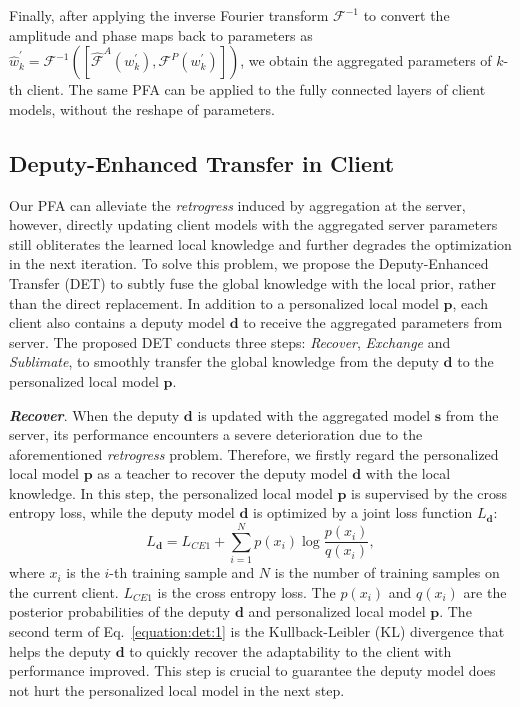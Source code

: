 \documentclass[runningheads]{llncs}
\begin{document}
Finally, after applying the inverse Fourier transform $\mathcal{F}^{-1}$ to convert the amplitude and phase maps back to parameters as $\hat{w}_{k}^{'}=\mathcal{F}^{-1}([\hat{\mathcal{F}}^{A}(w_{k}^{'}), \mathcal{F}^{P}(w_{k}^{'})])$, we obtain the aggregated parameters of $k$-th client. The same PFA can be applied to the fully connected layers of client models, without the reshape of parameters.
\subsection{Deputy-Enhanced Transfer in Client}
Our PFA can alleviate the \textit{retrogress} induced by aggregation at the server, however, directly updating client models with the aggregated server parameters still obliterates the learned local knowledge and further degrades the optimization in the next iteration. To solve this problem, we propose the Deputy-Enhanced Transfer (DET) to subtly fuse the global knowledge with the local prior, rather than the direct replacement. 
In addition to a personalized local model $\bm{p}$, each client also contains a deputy model $\bm{d}$ to receive the aggregated parameters from server. The proposed DET conducts three steps: \textit{Recover}, \textit{Exchange} and \textit{Sublimate}, to smoothly transfer the global knowledge from the deputy $\bm{d}$ to the personalized local model $\bm{p}$.

\noindent\textit{\textbf{Recover}}. When the deputy $\bm{d}$ is updated with the aggregated model $\bm{s}$ from the server, its performance encounters a severe deterioration due to the aforementioned \textit{retrogress} problem. Therefore, we firstly regard the personalized local model $\bm{p}$ as a teacher to recover the deputy model $\bm{d}$ with the local knowledge. In this step, the personalized local model $\bm{p}$ is supervised by the cross entropy loss, while the deputy model $\bm{d}$ is optimized by a joint loss function $L_{\bm{d}}$:
\begin{equation}
\label{equation:det:1}
    L_{\bm{d}} = L_{CE1} + \sum_{i=1}^{N} {p} ({x}_i)\log \frac{{p} ({x}_i) }{{q} ({x}_i)},
\end{equation}
where ${x}_{i}$ is the $i$-th training sample and $N$ is the number of training samples on the current client. $L_{CE1}$ is the cross entropy loss. The ${p}({x}_i)$ and ${q} ({x}_i)$ are the posterior probabilities of the deputy $\bm{d}$ and personalized local model ${\bm{p}}$. The second term of Eq.~\eqref{equation:det:1} is the Kullback-Leibler (KL) divergence that helps the deputy $\bm{d}$ to quickly recover the adaptability to the client with performance improved. This step is crucial to guarantee the deputy model does not hurt the personalized local model in the next step.
\end{document}
